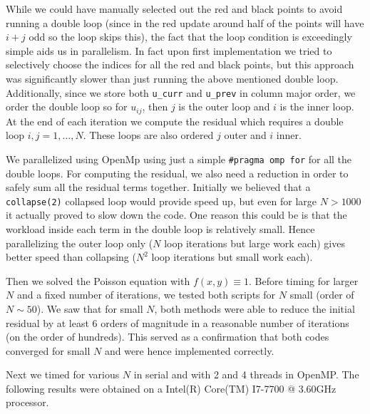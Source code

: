 \documentclass[10pt]{article}
\begin{document}
\begin{enumerate}
While we could have manually selected out the red and black points to avoid running a double loop (since in the red update around half of the points will have $i+j$ odd so the loop skips this), the fact that the loop condition is exceedingly simple aids us in parallelism. In fact upon first implementation we tried to selectively choose the indices for all the red and black points, but this approach was significantly slower than just running the above mentioned double loop. Additionally, since we store both \texttt{u\_curr} and \texttt{u\_prev} in column major order, we order the double loop so for $u_{ij}$, then $j$ is the outer loop and $i$ is the inner loop. At the end of each iteration we compute the residual which requires a double loop $i,j=1, \dotsc,N$. These loops are also ordered $j$ outer and $i$ inner.

We parallelized using OpenMp using just a simple \texttt{\#pragma omp for} for all the double loops. For computing the residual, we also need a reduction in order to safely sum all the residual terms together. Initially we believed that a \texttt{collapse(2)} collapsed loop would provide speed up, but even for large $N > 1000$ it actually proved to slow down the code. One reason this could be is that the workload inside each term in the double loop is relatively small. Hence parallelizing the outer loop only ($N$ loop iterations but large work each) gives better speed than collapsing ($N^{2}$ loop iterations but small work each).

Then we solved the Poisson equation with $f(x,y) \equiv 1$. Before timing for larger $N$ and a fixed number of iterations, we tested both scripts for $N$ small (order of $N \sim 50$). We saw that for small $N$, both methods were able to reduce the initial residual by at least 6 orders of magnitude in a reasonable number of iterations (on the order of hundreds). This served as a confirmation that both codes converged for small $N$ and were hence implemented correctly.

Next we timed for various $N$ in serial and with 2 and 4 threads in OpenMP. The following results were obtained on a Intel(R) Core(TM) I7-7700 @ 3.60GHz processor.


\end{enumerate}
\end{document}

